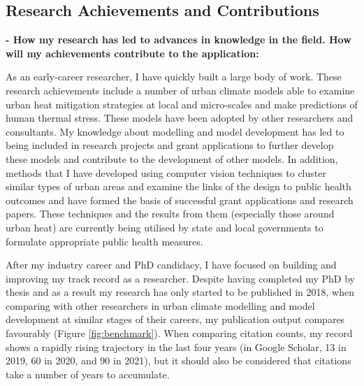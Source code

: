 \subsection*{\TitleFont Research Achievements and Contributions}

\textbf{- How my research has led to advances in knowledge in the field. How will my achievements contribute to the application:}


As an early-career researcher, I have quickly built a large body of work. These research achievements include a number of urban climate models able to examine urban heat mitigation strategies at local and micro-scales and make predictions of human thermal stress. These models have been adopted by other researchers and consultants. My knowledge about modelling and model development has led to being included in research projects and grant applications to further develop these models and contribute to the development of other models. In addition, methods that I have developed using computer vision techniques to cluster similar types of urban areas and examine the links of the design to public health outcomes and have formed the basis of successful grant applications and research papers. These techniques and the results from them (especially those around urban heat) are currently being utilised by state and local governments to formulate appropriate public health measures.

After my industry career and PhD candidacy, I have focused on building and improving my track record as a researcher. Despite having completed my PhD by thesis and as a result my research has only started to be published in 2018, when comparing with other researchers in urban climate modelling and model development at similar stages of their careers, my publication output compares favourably (Figure \ref{fig:benchmark}). When comparing citation counts, my record shows a rapidly rising trajectory in the last four years (in Google Scholar, 13 in 2019, 60 in 2020, and 90 in 2021), but it should also be considered that citations take a number of years to accumulate.



